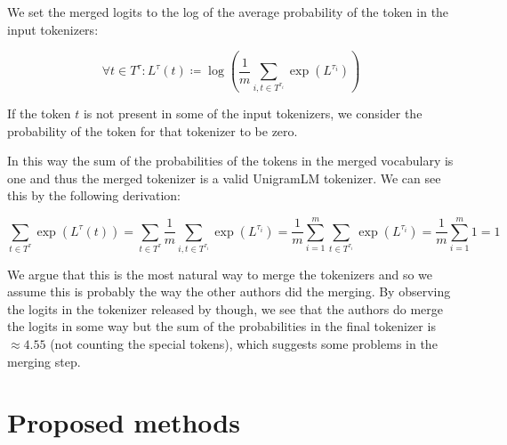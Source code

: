 We set the merged logits to the log of the average probability of the token in the input tokenizers:

\begin{equation}
    \forall t \in T^\tau: L^\tau(t) \coloneqq \log(\frac{1}{m} \sum_{i, t \in T^{\tau_i}} \exp(L^{\tau_i}))
\end{equation}

If the token $t$ is not present in some of the input tokenizers, we consider the probability of the token for that tokenizer to be zero. 

In this way the sum of the probabilities of the tokens in the merged vocabulary is one and thus the merged tokenizer is a valid UnigramLM tokenizer. We can see this by the following derivation:

\begin{equation}
    \sum_{t \in T^\tau} \exp(L^\tau(t)) = \sum_{t \in T^\tau} \frac{1}{m} \sum_{i, t \in T^{\tau_i}} \exp(L^{\tau_i}) = \frac{1}{m} \sum_{i=1}^m \sum_{t \in T^{\tau_i}} \exp(L^{\tau_i}) = \frac{1}{m} \sum_{i=1}^m 1 = 1
\end{equation}


We argue that this is the most natural way to merge the tokenizers and so we assume this is probably the way the other authors did the merging. By observing the logits in the tokenizer released by \citet{liang_xlm-v_2023} though, we see that the authors do merge the logits in some way but the sum of the probabilities in the final tokenizer is $\approx 4.55$ (not counting the special tokens), which suggests some problems in the merging step.




\section{Proposed methods}


